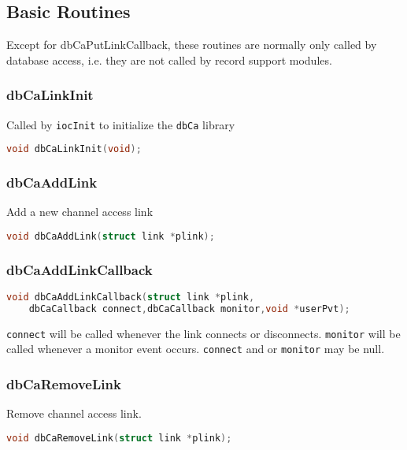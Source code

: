 \subsection{Basic Routines}

Except for dbCaPutLinkCallback, these routines are normally only called by database access, i.e. they are not called by record support modules.

\subsubsection{dbCaLinkInit}

Called by \verb|iocInit| to initialize the \verb|dbCa| library

\begin{lstlisting}[language=C]
void dbCaLinkInit(void);
\end{lstlisting}

\subsubsection{dbCaAddLink}

Add a new channel access link

\begin{lstlisting}[language=C]
void dbCaAddLink(struct link *plink);
\end{lstlisting}

\subsubsection{dbCaAddLinkCallback}

\begin{lstlisting}[language=C]
void dbCaAddLinkCallback(struct link *plink,
    dbCaCallback connect,dbCaCallback monitor,void *userPvt);
\end{lstlisting}

\verb|connect| will be called whenever the link connects or disconnects.
\verb|monitor| will be called whenever a monitor event occurs.
\verb|connect| and or \verb|monitor| may be null.

\subsubsection{dbCaRemoveLink}

Remove channel access link.

\begin{lstlisting}[language=C]
void dbCaRemoveLink(struct link *plink);
\end{lstlisting}

